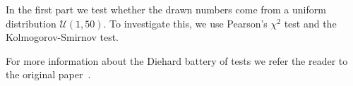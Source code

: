 In the first part we test whether the drawn numbers come from a uniform distribution $\mathcal{U}(1, 50)$. To investigate this,
we use Pearson's $\chi^2$ test and the Kolmogorov-Smirnov test.

For more information about the Diehard battery of tests we refer the reader to the original paper~\cite{currentRNG}.

